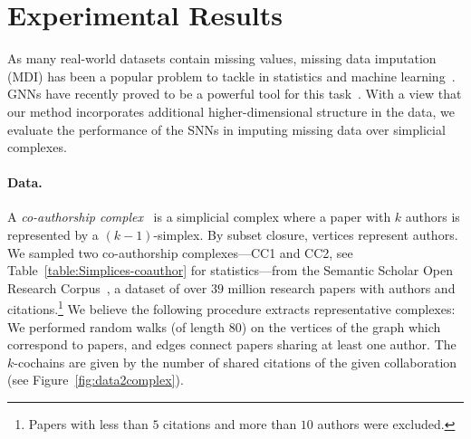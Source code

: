 \section{Experimental Results}

As many real-world datasets contain missing values, missing data imputation (MDI) has been a popular problem to tackle in statistics and machine learning~\cite{little1986statistical, nelwamondo2007missing}.
GNNs have recently proved to be a powerful tool for this task~\cite{spinelli2020neural}.
With a view that our method incorporates additional higher-dimensional structure in the data, we evaluate the performance of the SNNs in imputing missing data over simplicial complexes.

\paragraph{Data.}
A \emph{co-authorship complex}~\cite{patania2017} is a simplicial complex where a paper with $k$ authors is represented by a $(k-1)$-simplex.
By subset closure, vertices represent authors.
We sampled two co-authorship complexes---CC1 and CC2, see Table~\ref{table:Simplices-coauthor} for statistics---from the Semantic Scholar Open Research Corpus~\cite{ammar18NAACL}, a dataset of over $39$ million research papers with authors and citations.\footnote{Papers with less than $5$ citations and more than $10$ authors were excluded.}
We believe the following procedure extracts representative complexes: We performed random walks (of length $80$) on the vertices of the graph which correspond to papers, and edges connect papers sharing at least one author. 
The $k$-cochains are given by the number of shared citations of the given collaboration (see Figure~\ref{fig:data2complex}).

